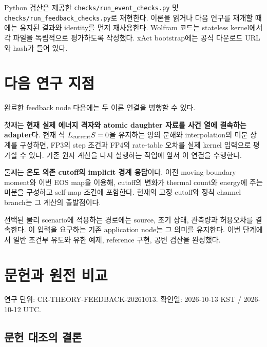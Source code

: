 \documentclass[11pt,a4paper]{article}
\begin{document}
Python 검산은 제공한 \texttt{checks/run\_event\_checks.py} 및 \texttt{checks/run\_feedback\_checks.py}로 재현한다. 이론을 읽거나 다음 연구를 재개할 때에는 유지된 결과와 identity를 먼저 재사용한다. Wolfram 코드는 stateless kernel에서 각 파일을 독립적으로 평가하도록 작성했다. xAct bootstrap에는 공식 다운로드 URL와 hash가 들어 있다.

\hypertarget{uxb2e4uxc74c-uxc5f0uxad6c-uxc9c0uxc810}{%
\section{다음 연구 지점}\label{uxb2e4uxc74c-uxc5f0uxad6c-uxc9c0uxc810}}

완료한 feedback node 다음에는 두 이론 연결을 병행할 수 있다.

첫째는 \textbf{현재 실제 에너지 격자와 atomic daughter 자료를 사건 열에 결속하는 adapter}다. 현재 식 \(L_{\rm current}S=0\)을 유지하는 양의 분해와 interpolation의 미분 상계를 구성하면, FP3의 step 조건과 FP4의 rate-table 오차를 실제 kernel 입력으로 평가할 수 있다. 기존 원자 계산을 다시 실행하는 작업에 앞서 이 연결을 수행한다.

둘째는 \textbf{온도 의존 cutoff의 implicit 경계 응답}이다. 이전 moving-boundary moment와 이번 EOS map을 이용해, cutoff의 변화가 thermal count와 energy에 주는 미분을 구성하고 self-map 조건에 포함한다. 현재의 고정 cutoff와 정칙 channel branch는 그 계산의 출발점이다.

선택된 물리 scenario에 적용하는 경로에는 source, 초기 상태, 관측량과 허용오차를 결속한다. 이 입력을 요구하는 기존 application node는 그 의미를 유지한다. 이번 단계에서 일반 조건부 유도와 유한 예제, reference 구현, 공변 검산을 완성했다.

\hypertarget{uxbb38uxd5ccuxacfc-uxc6d0uxc804-uxbe44uxad50}{%
\section{문헌과 원전 비교}\label{uxbb38uxd5ccuxacfc-uxc6d0uxc804-uxbe44uxad50}}

\begingroup
\small

연구 단위: CR-THEORY-FEEDBACK-20261013. 확인일: 2026-10-13 KST / 2026-10-12 UTC.

\hypertarget{uxbb38uxd5cc-uxb300uxc870uxc758-uxacb0uxb860}{%
\subsection{문헌 대조의 결론}\label{uxbb38uxd5cc-uxb300uxc870uxc758-uxacb0uxb860}}
\end{document}
